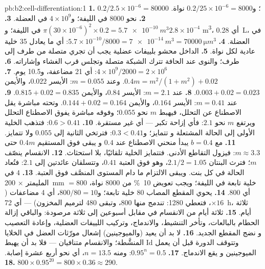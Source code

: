 \begin{solution}{pb:b2:cell-differentiation:1}
\textbf{1.} $0.2/2.5\times 10^{-6} = \num{80000}$ ؛
و$0.2/25\times 10^{-6} = \num{8000}$ نواة.
\textbf{2.} نحو \num{8000} في الليفة؛ و$4\times 10^{9}$ في
العضلة.
\textbf{3.} $\pi(30\times 10^{-6})^{2}\times 0.2 = \qty{5.7e-10}{m^3}$
في الليفة؛ و$2.8\times 10^{-4}$ \unit{m^3}، أي \qty{0.28}{L}، في
العضلة.
\textbf{4.} $5.7\times 10^{-10}/8000 = \qty{7e-14}{m^3} =
\qty{70000}{\micro m^3}$: أي ما يعادل 35 خلية عادية لكل نواة.
\textbf{5.} الداخل محشو بلييفات عضلية يجب أن تجري
متصلة من طرف إلى طرف؛ والنوى عند الحافة تترك الشبكة
متصلة وتجلس قرب الغشاء وإشاراته.
\textbf{6.} $4\times 10^{9}/2000 = 2\times 10^{6}$: أي 21 مضاعفة، و10.5
يوم.
\textbf{7.} $0.4m = m^{2}/(1 + m^{2}) + 0.02$. وعند $m = 0.055$: الأيسر
$0.022$، والأيمن $0.003 + 0.02 = 0.023$.
\textbf{8.} عند $m = 2.1$: الأيسر $0.84$، والأيمن $0.815 + 0.02 = 0.835$.
\textbf{9.} عند $m = 0.41$: الأيسر $0.164$، والأيمن $0.144 + 0.02 = 0.164$.
وتحته مباشرة يقل الاصطناع عن التحلل، فيهبط $m$
نحو $0.055$؛ وفوقه مباشرة يفوق الاصطناع التحلل ويرتفع $m$
نحو $2.1$: فأي إزاحة تكبر --- أي غير مستقرة.
\textbf{10.} $0.6 > 0.41$: فتذهب الخلية الأولى إلى الحالة المشتعلة و
تتمايز؛ و$0.3 < 0.41$: فترتخي الثانية إلى $0.055$ ولا
تتمايز.
\textbf{11.} مع $b = 0.4$ يبدأ منحني الاصطناع عند $0.4$ و
يبقى فوق المستقيم $0.4m$ حتى $m \approx 3.3$: فيزول التقاطع
الأدنى. فتتمايز الخلية تلقائيًا، بلا استحثاث.
\textbf{12.} الانقسام ينصّف $m$؛ فترث البنتان $2.1/2 =
1.05$، وهو فوق العتبة $0.41$، وتتسلقان عائدتين إلى $2.1$: فتُعاد
الحالة في كل بنت. ويبقى الالتزام ما دام
المستوى المنصَّف فوق العتبة.
\textbf{13.} $4$ في المليمتر $\times$ \qty{200}{mm} $= 800$ خلية تابعة
في الليفة؛ ويجب تعويض \qty{10}{\%} من \num{8000} نواة، أي \num{800}.
\textbf{14.} يحوي المقطع المصاب $80$ خلية تابعة؛ و$800/80 =
10$، أي 4 مضاعفات ($\times 16$، فتعطي \num{1280}: تندمج منها 800، وتبقى 480
لترميم المخزون) --- أي \qty{72}{h}، ثلاثة أيام.
\textbf{15.} ثلاثة أيام من الانقسام في مقابل أسبوعين إلى ثلاثة
مرصودة: والباقي إزالة الحطام بالبالعات، وتأخر
التنشيط، والاندماج، وتركيب اللييفات العضلية، وإعادة التعصيب و
نضج المقطع الجديد.
\textbf{16.} لا بد أن يعيد  (والميوجينين) إشعال مورّثات العضل
في الخلايا المنشَّطة؛ والانقسام  متنافيان
--- فلا بد أن يهبط Id وتتوقف الدورة قبل أن يعمل الميوجينين و
يقع الاندماج.
\textbf{17.} $0.95^{n} = 0.5$: ومنه $n = 13.5$، أي نحو أربع عشرة إصابة.
\textbf{18.} $800\times 0.95^{20} = 800\times 0.36 \approx 290$.

\end{solution}

